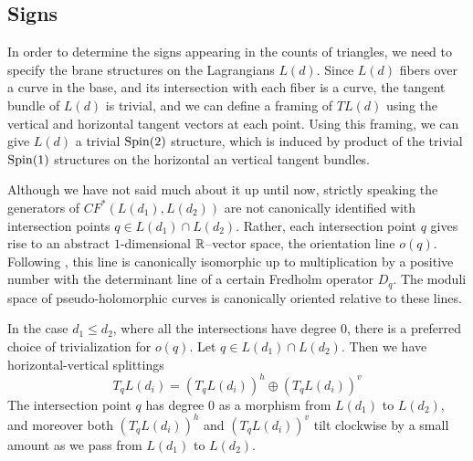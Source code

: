 \documentclass[12pt]{amsart}
\begin{document}

\subsection{Signs}
\label{sec:signs}

In order to determine the signs appearing in the counts of triangles,
we need to specify the brane structures on the Lagrangians
$L(d)$. Since $L(d)$ fibers over a curve in the base, and its
intersection with each fiber is a curve, the tangent bundle of $L(d)$ is
trivial, and we can define a framing of $TL(d)$ using the vertical and
horizontal tangent vectors at each point. Using this framing, we can
give $L(d)$ a trivial $\mathrm{Spin}(2)$ structure, which is induced by
product of the trivial $\mathrm{Spin}(1)$ structures on the horizontal an
vertical tangent bundles.

Although we have not said much about it up until now, strictly
speaking the generators of $CF^*(L(d_1),L(d_2))$ are not canonically
identified with intersection points $q \in L(d_1)\cap L(d_2)$. Rather,
each intersection point $q$ gives rise to an abstract $1$-dimensional
$\mathbb{R}$--vector space, the orientation line $o(q)$. Following
\cite[Ch. 11]{seidel-book}, this line is canonically isomorphic up to
multiplication by a positive number with the determinant line of a
certain Fredholm operator $D_q$. The moduli space of
pseudo-holomorphic curves is canonically oriented relative to these lines.

In the case $d_1 \leq d_2$, where all the intersections have degree
$0$, there is a preferred choice of trivialization for $o(q)$. Let $q
\in L(d_1)\cap L(d_2)$. Then we have horizontal-vertical splittings
\begin{equation}
  T_qL(d_i) = (T_qL(d_i))^h \oplus (T_qL(d_i))^v
\end{equation}
The intersection point $q$ has degree $0$ as a morphism from $L(d_1)$
to $L(d_2)$, and moreover both $(T_qL(d_i))^h$ and $(T_qL(d_i))^v$
tilt clockwise by a small amount as we pass from $L(d_1)$ to
$L(d_2)$. 
\end{document}
